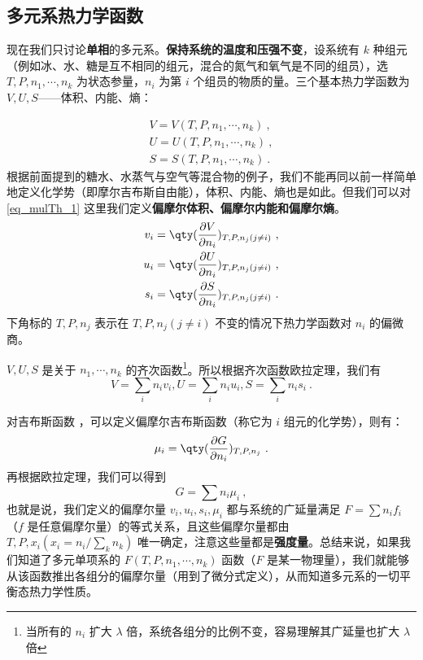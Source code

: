 \subsection{多元系热力学函数}

现在我们只讨论\textbf{单相}的多元系。\textbf{保持系统的温度和压强不变}，设系统有 $k$ 种组元（例如冰、水、糖是互不相同的组元，混合的氮气和氧气是不同的组员），选 $T,P,n_1,\cdots,n_k$ 为状态参量，$n_i$ 为第 $i$ 个组员的物质的量。三个基本热力学函数为 $V,U,S$——体积、内能、熵：

\begin{equation}\label{eq_mulTh_1}
\begin{aligned}
V=V(T,P,n_1,\cdots,n_k)~,\\
U=U(T,P,n_1,\cdots,n_k)~,\\
S=S(T,P,n_1,\cdots,n_k)~.
\end{aligned}
\end{equation}
根据前面提到的糖水、水蒸气与空气等混合物的例子，我们不能再同以前一样简单地定义化学势（即摩尔吉布斯自由能），体积、内能、熵也是如此。但我们可以对\autoref{eq_mulTh_1}  这里我们定义\textbf{偏摩尔体积、偏摩尔内能和偏摩尔熵}。
\begin{equation}
\begin{aligned}
v_i=\qty(\frac{\partial V}{\partial n_i})_{T,P,n_j(j\neq i)}~,\\
u_i=\qty(\frac{\partial U}{\partial n_i})_{T,P,n_j(j\neq i)}~,\\
s_i=\qty(\frac{\partial S}{\partial n_i})_{T,P,n_j(j\neq i)}~.
\end{aligned}
\end{equation}
下角标的 $T,P,n_j$ 表示在 $T,P,n_j(j\neq i)$ 不变的情况下热力学函数对 $n_i$ 的偏微商。

$V,U,S$ 是关于 $n_1,\cdots,n_k$ 的齐次函数\footnote{当所有的 $n_i$ 扩大 $\lambda$ 倍，系统各组分的比例不变，容易理解其广延量也扩大 $\lambda$ 倍}。所以根据齐次函数欧拉定理，我们有
\begin{equation}
V=\sum_i n_iv_i,U=\sum_i n_iu_i,S=\sum_i n_is_i~.
\end{equation}

对吉布斯函数 ，可以定义偏摩尔吉布斯函数（称它为 $i$ 组元的化学势），则有：
\begin{equation}\label{eq_mulTh_4}
\mu_i=\qty(\frac{\partial G}{\partial n_i})_{T,P,n_j}~.
\end{equation}
再根据欧拉定理，我们可以得到
\begin{equation}\label{eq_mulTh_2}
G=\sum n_i \mu_i~,
\end{equation}
也就是说，我们定义的偏摩尔量 $v_i,u_i,s_i,\mu_i$ 都与系统的广延量满足 $F=\sum n_i f_i$ （$f$ 是任意偏摩尔量）的等式关系，且这些偏摩尔量都由 $T,P,x_i(x_i=n_i/\sum_k n_k)$ 唯一确定，注意这些量都是\textbf{强度量}。总结来说，如果我们知道了多元单项系的 $F(T,P,n_1,\cdots, n_k)$ 函数（$F$ 是某一物理量），我们就能够从该函数推出各组分的偏摩尔量（用到了微分式定义），从而知道多元系的一切平衡态热力学性质。

